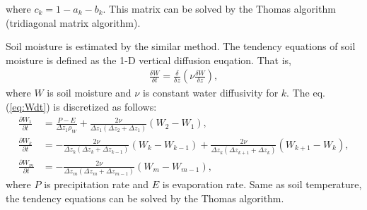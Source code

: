 where $c_{k} = 1 - a_{k} - b_{k}$.
This matrix can be solved by the Thomas algorithm (tridiagonal matrix algorithm).

Soil moisture is estimated by the similar method.
The tendency equations of soil moisture is defined as the 1-D vertical diffusion euqation.
That is,
\begin{align}
  \frac{\delta W}{\delta t} = \frac{\delta}{\delta z} \left( \nu \frac{\delta W}{\delta z} \right),
  \label{eq:Wdt}
\end{align}
where $W$ is soil moisture and $\nu$ is constant water diffusivity for $k$.
The eq. (\ref{eq:Wdt}) is discretized as follows:
\begin{align}
  \frac{\partial W_{1}}{\partial t} &= \frac{P - E}{\Delta z_{1} \rho_{W}} + \frac{2\nu}{\Delta z_{1}(\Delta z_{2}+\Delta z_{1})} (W_{2}-W_{1}), \\
  \frac{\partial W_{k}}{\partial t} &= - \frac{2\nu}{\Delta z_{k}(\Delta z_{k}+\Delta z_{k-1})} (W_{k}-W_{k-1}) + \frac{2\nu}{\Delta z_{k}(\Delta z_{k+1}+\Delta z_{k})} (W_{k+1}-W_{k}), \\
  \frac{\partial W_{m}}{\partial t} &= - \frac{2\nu}{\Delta z_{m}(\Delta z_{m}+\Delta z_{m-1})} (W_{m}-W_{m-1}),
\end{align}
where $P$ is precipitation rate and $E$ is evaporation rate.
Same as soil temperature, the tendency equations can be solved by the Thomas algorithm.
